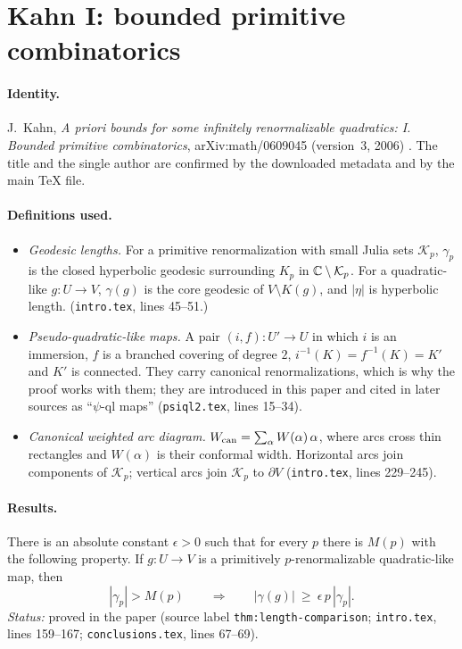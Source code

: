 \section{Kahn I: bounded primitive combinatorics}
\label{sec:kahn-I}

\paragraph{Identity.}
J.~Kahn, \emph{A priori bounds for some infinitely renormalizable quadratics: I.
Bounded primitive combinatorics}, arXiv:math/0609045 (version~3, 2006) \cite{KahnPrimitive}.  The title and
the single author are confirmed by the downloaded metadata and by the main TeX file.

\paragraph{Definitions used.}
\begin{itemize}
\item \emph{Geodesic lengths.} For a primitive renormalization with small Julia sets
$\mathcal K_p$, $\gamma_p$ is the closed hyperbolic geodesic surrounding $K_p$ in
$\mathbb C\setminus\mathcal K_p$.  For a quadratic-like $g\colon U\to V$, $\gamma(g)$ is the
core geodesic of $V\setminus K(g)$, and $|\eta|$ is hyperbolic length.
(\texttt{intro.tex}, lines 45--51.)
\item \emph{Pseudo-quadratic-like maps.} A pair $(i,f)\colon U'\to U$ in which $i$ is an
immersion, $f$ is a branched covering of degree $2$, $i^{-1}(K)=f^{-1}(K)=K'$ and $K'$ is
connected.  They carry canonical renormalizations, which is why the proof works with them;
they are introduced in this paper and cited in later sources as ``$\psi$-ql maps''
(\texttt{psiql2.tex}, lines 15--34).
\item \emph{Canonical weighted arc diagram.} $W_{\rm can}=\sum_\alpha W(\alpha)\,\alpha$,
where arcs cross thin rectangles and $W(\alpha)$ is their conformal width.  Horizontal arcs
join components of $\mathcal K_p$; vertical arcs join $\mathcal K_p$ to $\partial V$
(\texttt{intro.tex}, lines 229--245).
\end{itemize}

\paragraph{Results.}

\begin{theorem}
\label{thm:kahn-I-length}
There is an absolute constant $\epsilon>0$ such that for every $p$ there is $M(p)$ with the
following property.  If $g\colon U\to V$ is a primitively $p$-renormalizable quadratic-like
map, then
\[
|\gamma_p|>M(p)\qquad\Longrightarrow\qquad |\gamma(g)|\ \ge\ \epsilon\,p\,|\gamma_p|.
\]
\emph{Status:} proved in the paper (source label \texttt{thm:length-comparison};
\texttt{intro.tex}, lines 159--167; \texttt{conclusions.tex}, lines 67--69).
\end{theorem}


